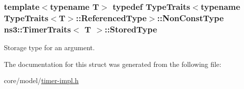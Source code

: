 \subsubsection[{\texorpdfstring{Stored\+Type}{StoredType}}]{\setlength{\rightskip}{0pt plus 5cm}template$<$typename T$>$ typedef {\bf Type\+Traits}$<$typename {\bf Type\+Traits}$<$T$>$\+::Referenced\+Type$>$\+::Non\+Const\+Type {\bf ns3\+::\+Timer\+Traits}$<$ T $>$\+::{\bf Stored\+Type}}\hypertarget{structns3_1_1TimerTraits_abbe3a268222f2bedc22882088f61a6b8}{}\label{structns3_1_1TimerTraits_abbe3a268222f2bedc22882088f61a6b8}
Storage type for an argument. 

The documentation for this struct was generated from the following file\+:\begin{DoxyCompactItemize}
\item 
core/model/\hyperlink{timer-impl_8h}{timer-\/impl.\+h}\end{DoxyCompactItemize}
